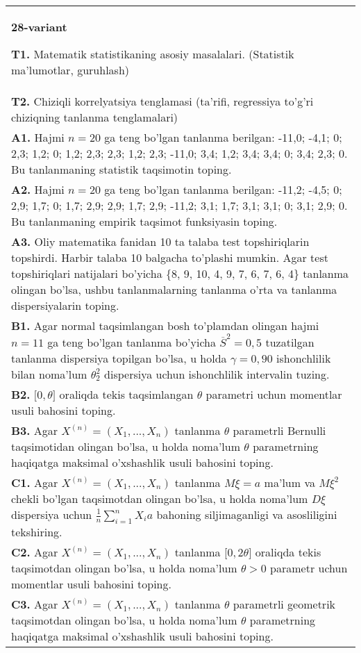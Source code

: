 \documentclass{article}
\begin{document}
\begin{tabular}{m{17cm}}
\textbf{28-variant}
\newline

\textbf{T1.} Matematik statistikaning asosiy masalalari. (Statistik ma'lumotlar, guruhlash)
\\
\textbf{T2.} 
Chiziqli korrelyatsiya tenglamasi (ta'rifi, regressiya to'g'ri chiziqning tanlanma tenglamalari)
\\
\textbf{A1.} 
Hajmi \(n = 20\) ga teng bo'lgan tanlanma berilgan: -11,0; -4,1; 0; 2,3; 1,2; 0; 1,2; 2,3; 2,3; 1,2; 2,3; -11,0; 3,4; 1,2; 3,4; 3,4; 0; 3,4; 2,3; 0. Bu tanlanmaning statistik taqsimotin toping.
\\
\textbf{A2.} 
Hajmi \(n = 20\) ga teng bo'lgan tanlanma berilgan: -11,2; -4,5; 0; 2,9; 1,7; 0; 1,7; 2,9; 2,9; 1,7; 2,9; -11,2; 3,1; 1,7; 3,1; 3,1; 0; 3,1; 2,9; 0. Bu tanlanmaning empirik taqsimot funksiyasin toping.
\\
\textbf{A3.} 
Oliy matematika fanidan 10 ta talaba test topshiriqlarin topshirdi. Harbir talaba 10 balgacha to'plashi mumkin. Agar test topshiriqlari natijalari bo'yicha \{8, 9, 10, 4, 9, 7, 6, 7, 6, 4\} tanlanma olingan bo'lsa, ushbu tanlanmalarning tanlanma o'rta va tanlanma dispersiyalarin toping.
\\
\textbf{B1.} 
Agar normal taqsimlangan bosh to'plamdan olingan hajmi \(n = 11\) ga teng bo'lgan tanlanma bo'yicha \({\overline{S}}^{2} = 0,5\) tuzatilgan tanlanma dispersiya topilgan bo'lsa, u holda \(\gamma = 0,90\) ishonchlilik bilan noma'lum \(\theta_{2}^{2}\) dispersiya uchun ishonchlilik intervalin tuzing.
\\
\textbf{B2.} 
\(\lbrack 0,\theta\rbrack\) oraliqda tekis taqsimlangan \(\theta\) parametri uchun momentlar usuli bahosini toping.
\\
\textbf{B3.} 
Agar \(X^{(n)} = \left( X_{1},...,X_{n} \right)\) tanlanma \(\theta\) parametrli Bernulli taqsimotidan olingan bo'lsa, u holda noma'lum \(\theta\) parametrning haqiqatga maksimal o'xshashlik usuli bahosini toping.
\\
\textbf{C1.} 
Agar \(X^{(n)} = \left( X_{1},...,X_{n} \right)\) tanlanma \(M\xi = a\) ma'lum va \(M\xi^{2}\) chekli bo'lgan taqsimotdan olingan bo'lsa, u holda noma'lum \(D\xi\) dispersiya uchun \(\frac{1}{n}\sum_{i = 1}^{n}{X_{i}a}\) bahoning siljimaganligi va asosliligini tekshiring.
\\
\textbf{C2.} 
Agar \(X^{(n)} = \left( X_{1},...,X_{n} \right)\) tanlanma {[}\(0,2\theta\rbrack\) oraliqda tekis taqsimotdan olingan bo'lsa, u holda noma'lum \(\theta > 0\) parametr uchun momentlar usuli bahosini toping.
\\
\textbf{C3.} 
Agar \(X^{(n)} = \left( X_{1},...,X_{n} \right)\) tanlanma \(\theta\) parametrli geometrik taqsimotdan olingan bo'lsa, u holda noma'lum \(\theta\) parametrning haqiqatga maksimal o'xshashlik usuli bahosini toping.
\\

\end{tabular}
\vspace{1cm}
\end{document}
